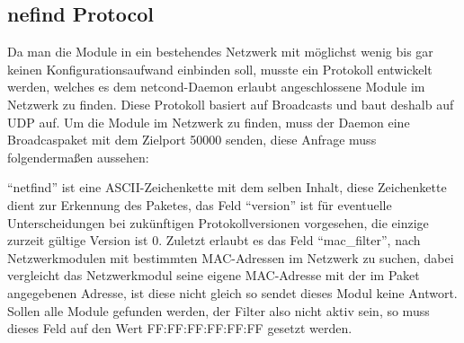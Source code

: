 \documentclass[a4paper,14pt,headsepline]{scrartcl}
\begin{document}
\subsection{nefind Protocol}
Da man die Module in ein bestehendes Netzwerk mit möglichst wenig bis gar keinen Konfigurationsaufwand einbinden soll, musste ein Protokoll entwickelt werden, welches es dem netcond-Daemon erlaubt angeschlossene Module im Netzwerk zu finden. Diese Protokoll basiert auf Broadcasts und baut deshalb auf UDP auf. Um die Module im Netzwerk zu finden, muss der Daemon eine Broadcaspaket mit dem Zielport 50000 senden, diese Anfrage muss folgendermaßen aussehen:
\begin{figure}[h]
\begin{center}
\end{center}
\end{figure}

"`netfind"' ist eine ASCII-Zeichenkette mit dem selben Inhalt, diese Zeichenkette dient zur Erkennung des Paketes, das Feld "`version"' ist für eventuelle Unterscheidungen bei zukünftigen Protokollversionen vorgesehen, die einzige zurzeit gültige Version ist 0. Zuletzt erlaubt es das Feld "`mac\_filter"', nach Netzwerkmodulen mit bestimmten MAC-Adressen im Netzwerk zu suchen, dabei vergleicht das Netzwerkmodul seine eigene MAC-Adresse mit der im Paket angegebenen Adresse, ist diese nicht gleich so sendet dieses Modul keine Antwort. Sollen alle Module gefunden werden, der Filter also nicht aktiv sein, so muss dieses Feld auf den Wert FF:FF:FF:FF:FF:FF gesetzt werden.
\end{document}
